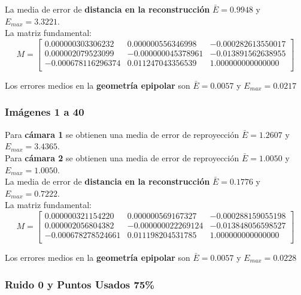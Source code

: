 \documentclass[a4paper, fontsize=11pt]{scrartcl} %
\numberwithin{equation}{section} %
\numberwithin{figure}{section} %
\numberwithin{table}{section} %
\begin{document}
	La media de error de \textbf{distancia en la reconstrucción} $\bar{E} = 0.9948$ y $E_{max} = 3.3221$.\\
	La matriz fundamental:
	\[
	M=
	\begin{bmatrix}
	0.000000303306232&	0.000000556346998&	-0.000282613550017 \\
	0.000002079523099&	-0.000000045378961&	-0.013891562638955 \\
	-0.000678116296374&	0.011247043356539&	1.000000000000000  \\
	
	\end{bmatrix}
	\]
	
	Los errores medios en la \textbf{geometría epipolar} son $\bar{E} =  0.0057$ y $E_{max} = 0.0217$
	
	\subsubsection*{Imágenes 1 a 40}
	
	Para \textbf{cámara 1} se obtienen una media de error de reproyección $\bar{E} = 1.2607$ y $E_{max} = 3.4365$.\\
	Para \textbf{cámara 2} se obtienen una media de error de reproyección $\bar{E} = 1.0050$ y $E_{max} = 1.0050$.\\
	
	La media de error de \textbf{distancia en la reconstrucción} $\bar{E} = 0.1776$ y $E_{max} = 0.7222$.\\
	La matriz fundamental:
	\[
	M=
	\begin{bmatrix}
	0.000000321154220&	0.000000569167327&	-0.000288159055198 \\
	0.000002056804382&	-0.000000022269124&	-0.013848056598527 \\
	-0.000678278524661&	0.011198204531785&	1.000000000000000  \\
	
	\end{bmatrix}
	\]
	
	Los errores medios en la \textbf{geometría epipolar} son $\bar{E} = 0.0057$ y $E_{max} = 0.0228$
	
	
	\subsubsection{Ruido 0 y Puntos Usados 75\%}
	
\end{document}
